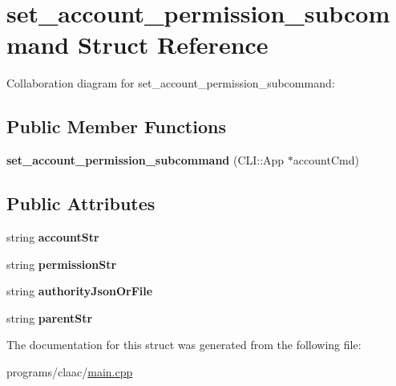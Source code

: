 \hypertarget{structset__account__permission__subcommand}{}\section{set\+\_\+account\+\_\+permission\+\_\+subcommand Struct Reference}
\label{structset__account__permission__subcommand}


Collaboration diagram for set\+\_\+account\+\_\+permission\+\_\+subcommand\+:
\subsection*{Public Member Functions}
\begin{DoxyCompactItemize}
\item 
\mbox{\label{structset__account__permission__subcommand_a2da47985a64e4a5c68e17ef4df9f8126}} 
{\bfseries set\+\_\+account\+\_\+permission\+\_\+subcommand} (C\+L\+I\+::\+App $\ast$account\+Cmd)
\end{DoxyCompactItemize}
\subsection*{Public Attributes}
\begin{DoxyCompactItemize}
\item 
\mbox{\label{structset__account__permission__subcommand_a9d8bd3c2208cb349c46bbe5d537ebd8d}} 
string {\bfseries account\+Str}
\item 
\mbox{\label{structset__account__permission__subcommand_a7d8f6024592a71a72299b4051de07dcc}} 
string {\bfseries permission\+Str}
\item 
\mbox{\label{structset__account__permission__subcommand_a48602089af185db5420ad6ad67a8d057}} 
string {\bfseries authority\+Json\+Or\+File}
\item 
\mbox{\label{structset__account__permission__subcommand_a4693dc41e0f97a92b37994d53f0e85dd}} 
string {\bfseries parent\+Str}
\end{DoxyCompactItemize}


The documentation for this struct was generated from the following file\+:\begin{DoxyCompactItemize}
\item 
programs/claac/\mbox{\hyperlink{programs_2claac_2main_8cpp}{main.\+cpp}}\end{DoxyCompactItemize}
